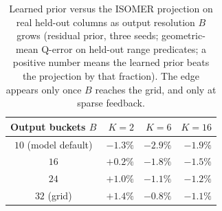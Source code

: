 \begin{table}[t]
  \centering\small
  \caption{Learned prior versus the ISOMER projection on real held-out columns as output
  resolution $B$ grows (residual prior, three seeds; geometric-mean Q-error on held-out range
  predicates; a positive number means the learned prior beats the projection by that fraction).
  The edge appears only once $B$ reaches the grid, and only at sparse feedback.}
  \label{tab:regime}
  \setlength{\tabcolsep}{10pt}
  \begin{tabular}{c r r r}
    \toprule
    Output buckets $B$ & $K{=}2$ & $K{=}6$ & $K{=}16$ \\
    \midrule
    $10$ (model default) & $-1.3\%$ & $-2.9\%$ & $-1.9\%$ \\
    $16$ & $+0.2\%$ & $-1.8\%$ & $-1.5\%$ \\
    $24$ & $+1.0\%$ & $-1.1\%$ & $-1.2\%$ \\
    $32$ (grid) & $\mathbf{+1.4\%}$ & $-0.8\%$ & $-1.1\%$ \\
    \bottomrule
  \end{tabular}
\end{table}
